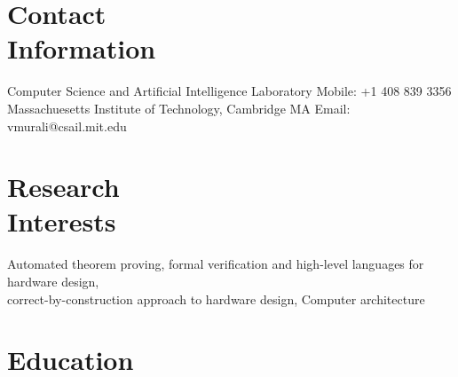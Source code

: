 \documentclass[margin,line]{resume}
\begin{document}
\begin{resume}

    \section{\mysidestyle Contact\\Information}

    Computer Science and Artificial Intelligence Laboratory   \hfill Mobile: +1 408 839 3356          \\
    Massachuesetts Institute of Technology, Cambridge MA     \hfill Email: vmurali@csail.mit.edu    \\

    \vspace{-7mm}
    \section{\mysidestyle Research\\Interests}

    Automated theorem proving, formal verification and high-level languages for hardware design,\\
    correct-by-construction approach to hardware design, Computer architecture

    \vspace{-3mm}
    \section{\mysidestyle Education}


\end{resume}
\end{document}
